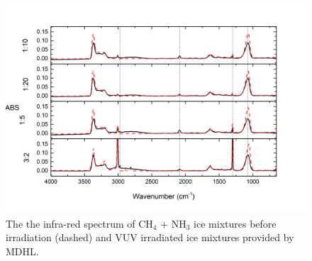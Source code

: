 \begin{figure}
\centering
\includegraphics[width=\textwidth]{figures/chapter3/widerange.png}
\caption{The the infra-red spectrum of CH$_4$ + NH$_3$ ice mixtures before irradiation (dashed) and VUV irradiated ice mixtures provided by MDHL. }
\label{fig:widerange}
\end{figure}

